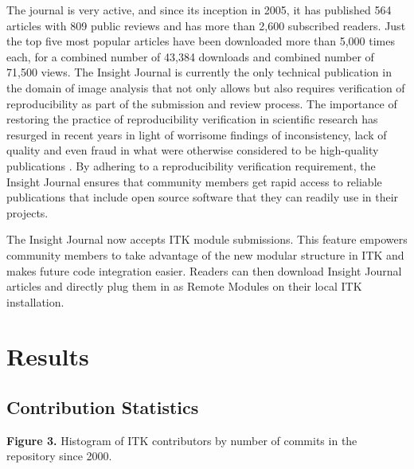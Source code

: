 \documentclass{frontiersENG} %
\begin{document}
%
%
%
The journal is very active, and since its inception in 2005, it has published
564 articles with 809 public reviews and has more than 2,600 subscribed
readers. Just the top five most popular articles have been downloaded more than
5,000 times each, for a combined number of 43,384 downloads and combined number
of 71,500 views. The Insight Journal is currently the only technical
publication in the domain of image analysis that not only allows but also
requires verification of reproducibility as part of the submission and review
process. The importance of restoring the practice of reproducibility
verification in scientific research has resurged in recent years in light of
worrisome findings of inconsistency, lack of quality and even fraud in what
were otherwise considered to be high-quality publications \cite{Begley2012}. By
adhering to a reproducibility verification requirement, the Insight Journal
ensures that community members get rapid access to reliable publications that
include open source software that they can readily use in their projects.

The Insight Journal now accepts ITK module submissions. This feature empowers
community members to take advantage of the new modular structure in ITK and
makes future code integration easier. Readers can then download Insight Journal
articles and directly plug them in as Remote Modules on their local ITK
installation.




\section{Results}



\subsection{Contribution Statistics}

\textbf{Figure 3. }{Histogram of ITK contributors by number of commits in the repository since 2000.}\label{fig:03}
\end{document}
